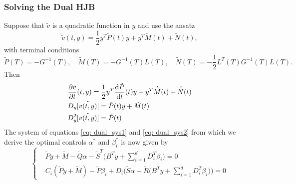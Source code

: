 \subsubsection{Solving the Dual HJB}
Suppose that $\tilde{v}$ is a quadratic function in $y$ and use the ansatz
\begin{equation}
    \tilde{v}(t,y) = \frac12 y^T \tilde{P}(t) y + y^T \tilde{M}(t) + \tilde{N}(t),
\end{equation}
with terminal conditions
\begin{equation}
    \tilde{P}(T) = -G^{-1}(T), \quad \tilde{M}(T) = - G^{-1}(T)L(T), \quad \tilde{N}(T) = -\frac12 L^T(T)G^{-1}(T)L(T). \label{eq: dual_terminal_conditions}
\end{equation}
Then
\begin{align*}
    &\frac{\partial \tilde{v}}{\partial t}(t, y) = \frac12 y^T \frac{\mathop{}\!\mathrm{d} \tilde{P}}{\mathop{}\!\mathrm{d} t}(t) y + y^T \dot{\tilde{M}}(t) + \dot{\tilde{N}}(t)\\
    &D_y[\tilde{v(t,y)}] = \tilde{P}(t) y + \tilde{M}(t)\\
    &D_y^2[\tilde{v(t,y)}] = \tilde{P}(t)
\end{align*}
The system of equations \eqref{eq: dual_sys1} and \eqref{eq: dual_sys2} from which we derive the optimal controls $\alpha^\ast$ and $\beta_i^\ast$ is now given by 
\begin{equation}
\begin{cases}
    &\tilde{P}y + \tilde{M} - \tilde{Q}\alpha - \tilde{S}^T \bigg(B^T y + \sum_{i=1}^d D_i^T \beta_i\bigg) = 0\\
    &C_i (\tilde{P}y + \tilde{M}) - \tilde{P} \beta_i
    + D_i \bigg(\tilde{S}\alpha + \tilde{R}\bigg(B^T y + \sum_{i=1}^d D_i^T \beta_i\bigg)\bigg) = 0
\end{cases} \label{eq: dual_hjb_system_controls}
\end{equation}
